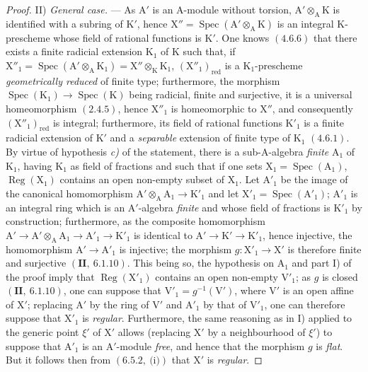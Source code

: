 \begin{proof}
II) \emph{General case.} --- As $\mathrm{A}'$ is an $\mathrm{A}$-module without torsion, $\mathrm{A}'\otimes_\mathrm{A}\mathrm{K}$ is identified with a
subring of $\mathrm{K}'$, hence $\mathrm{X}''=\operatorname{Spec}(\mathrm{A}'\otimes_\mathrm{A}\mathrm{K})$ is an integral $\mathrm{K}$-prescheme whose field of
rational functions is $\mathrm{K}'$. One knows $(4.6.6)$ that there exists a finite radicial extension
$\mathrm{K}_1$ of $\mathrm{K}$ such that, if $\mathrm{X}''_1=\operatorname{Spec}(\mathrm{A}'\otimes_\mathrm{A}\mathrm{K}_1)=\mathrm{X}''\otimes_\mathrm{K}\mathrm{K}_1$, $(\mathrm{X}''_1)_{\mathrm{red}}$ is a $\mathrm{K}_1$-prescheme \emph{geometrically
reduced} of finite type; furthermore, the morphism $\operatorname{Spec}(\mathrm{K}_1)\to\operatorname{Spec}(\mathrm{K})$ being radicial,
finite and surjective, it is a universal homeomorphism $(2.4.5)$, hence $\mathrm{X}''_1$ is homeomorphic
to $\mathrm{X}''$, and consequently $(\mathrm{X}''_1)_{\mathrm{red}}$ is integral; furthermore, its field of rational functions $\mathrm{K}'_1$
is a finite radicial extension of $\mathrm{K}'$ and a \emph{separable} extension of finite type of $\mathrm{K}_1$ $(4.6.1)$.
By virtue of hypothesis \emph{c)} of the statement, there is a sub-$\mathrm{A}$-algebra \emph{finite} $\mathrm{A}_1$ of $\mathrm{K}_1$, having $\mathrm{K}_1$
as field of fractions and such that if one sets $\mathrm{X}_1=\operatorname{Spec}(\mathrm{A}_1)$, $\operatorname{Reg}(\mathrm{X}_1)$ contains an
open non-empty subset of $\mathrm{X}_1$. Let $\mathrm{A}'_1$ be the image of the canonical homomorphism $\mathrm{A}'\otimes_\mathrm{A}\mathrm{A}_1\to\mathrm{K}'_1$
and let $\mathrm{X}'_1=\operatorname{Spec}(\mathrm{A}'_1)$; $\mathrm{A}'_1$ is an integral ring which is an $\mathrm{A}'$-algebra \emph{finite} and whose
field of fractions is $\mathrm{K}'_1$ by construction; furthermore, as the composite homomorphism
$\mathrm{A}'\to\mathrm{A}'\otimes_\mathrm{A}\mathrm{A}_1\to\mathrm{A}'_1\to\mathrm{K}'_1$ is identical to $\mathrm{A}'\to\mathrm{K}'\to\mathrm{K}'_1$, hence injective, the homomorphism
$\mathrm{A}'\to\mathrm{A}'_1$ is injective; the morphism $g:\mathrm{X}'_1\to\mathrm{X}'$ is therefore finite and surjective $(\mathbf{II},~6.1.10)$.
This being so, the hypothesis on $\mathrm{A}_1$ and part I) of the proof imply that $\operatorname{Reg}(\mathrm{X}'_1)$
contains an open non-empty $\mathrm{V}'_1$; as $g$ is closed $(\mathbf{II},~6.1.10)$, one can suppose
that $\mathrm{V}'_1=g^{-1}(\mathrm{V}')$, where $\mathrm{V}'$ is an open affine of $\mathrm{X}'$; replacing $\mathrm{A}'$ by the ring of $\mathrm{V}'$
and $\mathrm{A}'_1$ by that of $\mathrm{V}'_1$, one can therefore suppose that $\mathrm{X}'_1$ is \emph{regular}. Furthermore, the same
reasoning as in I) applied to the generic point $\xi'$ of $\mathrm{X}'$ allows (replacing $\mathrm{X}'$
by a neighbourhood of $\xi'$) to suppose that $\mathrm{A}'_1$ is an $\mathrm{A}'$-module \emph{free}, and hence
that the morphism $g$ is \emph{flat}. But it follows then from $(6.5.2,~\text{(i)})$ that $\mathrm{X}'$ is \emph{regular}.
\end{proof}

